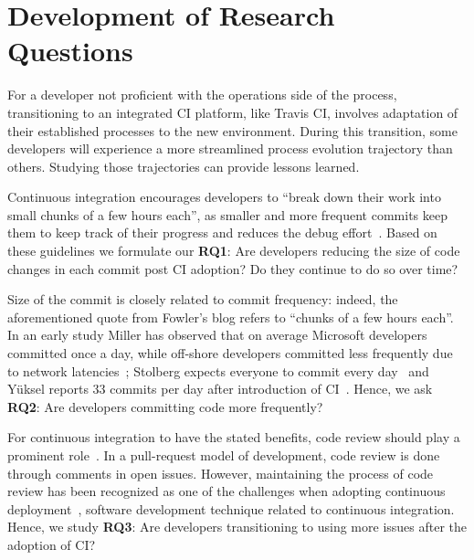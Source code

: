 
\section{Development of Research Questions}

For a developer not proficient with the operations side of the process, transitioning to an integrated CI platform, like Travis CI, involves adaptation of their established processes to the new environment. During this transition, some developers will experience a more streamlined process evolution trajectory than others. Studying those trajectories can provide lessons learned.


%

Continuous integration encourages developers to ``break down their work into small chunks of a few hours each'', 
as smaller and more frequent commits keep them to keep track of their progress and reduces the debug 
effort~\cite{Fowler,Duvall}. %
Based on these guidelines we formulate our \textbf{RQ1}: Are developers reducing the size of code changes in 
each commit post CI adoption? Do they continue to do so over time?

Size of the commit is closely related to commit frequency: indeed, the aforementioned quote from Fowler's blog refers to ``chunks of a few hours each''. 
In an early study Miller has observed that on average Microsoft developers committed once a day, while off-shore
 developers committed less frequently due to network latencies~\cite{Miller}; Stolberg expects everyone to 
 commit every day~\cite{Stolberg} and Y\"{u}ksel reports 33 commits per day after introduction of CI~\cite{Yuksel}. 
Hence, we ask \textbf{RQ2}: Are developers committing code more frequently?

For continuous integration to have the stated benefits, code review should play a prominent role~\cite{Miller}. 
In a pull-request model of development, code review is done through comments in open issues.
However, maintaining the process of code review has been recognized as one of the challenges when 
adopting continuous deployment~\cite{ClapsBSA}, software development technique related to continuous integration.
Hence, we study \textbf{RQ3}: Are developers transitioning to using more issues after the adoption of CI?

